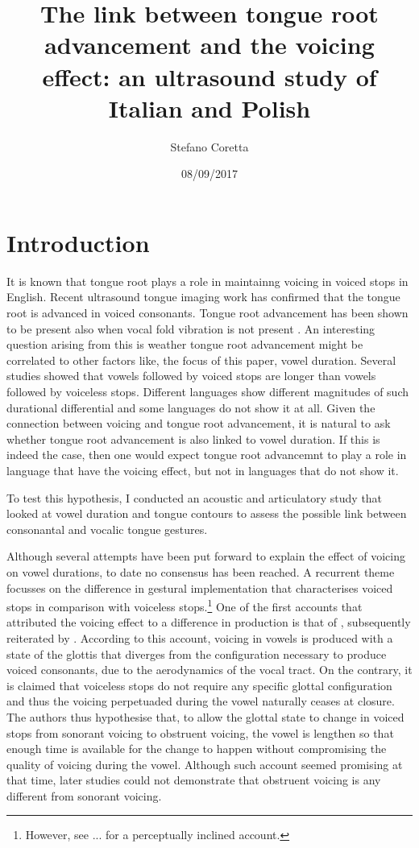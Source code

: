 \documentclass[]{elsarticle}
\title{The link between tongue root advancement and the voicing effect: an
ultrasound study of Italian and Polish}
\author{Stefano Coretta}
\date{08/09/2017}
\begin{document}
\maketitle

\section{Introduction}\label{introduction}

It is known that tongue root plays a role in maintainng voicing in
voiced stops in English. Recent ultrasound tongue imaging work has
confirmed that the tongue root is advanced in voiced consonants. Tongue
root advancement has been shown to be present also when vocal fold
vibration is not present \citep{ahn2016}. An interesting question
arising from this is weather tongue root advancement might be correlated
to other factors like, the focus of this paper, vowel duration. Several
studies showed that vowels followed by voiced stops are longer than
vowels followed by voiceless stops. Different languages show different
magnitudes of such durational differential and some languages do not
show it at all. Given the connection between voicing and tongue root
advancement, it is natural to ask whether tongue root advancement is
also linked to vowel duration. If this is indeed the case, then one
would expect tongue root advancemnt to play a role in language that have
the voicing effect, but not in languages that do not show it.

To test this hypothesis, I conducted an acoustic and articulatory study
that looked at vowel duration and tongue contours to assess the possible
link between consonantal and vocalic tongue gestures.

Although several attempts have been put forward to explain the effect of
voicing on vowel durations, to date no consensus has been reached. A
recurrent theme focusses on the difference in gestural implementation
that characterises voiced stops in comparison with voiceless
stops.\footnote{However, see ... for a perceptually inclined account.}
One of the first accounts that attributed the voicing effect to a
difference in production is that of \citet{halle1967}, subsequently
reiterated by \citet{chomsky1968}. According to this account, voicing in
vowels is produced with a state of the glottis that diverges from the
configuration necessary to produce voiced consonants, due to the
aerodynamics of the vocal tract. On the contrary, it is claimed that
voiceless stops do not require any specific glottal configuration and
thus the voicing perpetuaded during the vowel naturally ceases at
closure. The authors thus hypothesise that, to allow the glottal state
to change in voiced stops from sonorant voicing to obstruent voicing,
the vowel is lengthen so that enough time is available for the change to
happen without compromising the quality of voicing during the vowel.
Although such account seemed promising at that time, later studies could
not demonstrate that obstruent voicing is any different from sonorant
voicing.
\end{document}
